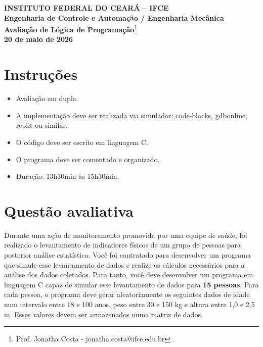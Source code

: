 \documentclass[11pt]{article}
\begin{document}
	
	\begin{center}
		\textbf{\large INSTITUTO FEDERAL DO CEARÁ – IFCE}\\
		\textbf{Engenharia de Controle e Automação / Engenharia Mecânica}\\
		\textbf{Avaliação de Lógica de Programação}\footnote{Prof. Jonatha Costa - jonatha.costa@ifce.edu.br}\\
		\textbf{20 de maio de 2026}
	\end{center}
	
	\section*{Instruções}
	
	\begin{itemize}
		\item Avaliação em dupla.
		\item A implementação deve ser realizada via simulador: code-blocks, gdbonline, replit ou similar.
		\item O código deve ser escrito em linguagem C.
        \item O programa deve ser comentado e organizado.
		\item Duração: 13h30min às 15h30min.
	\end{itemize}
	
	\section*{Questão avaliativa}
Durante uma ação de monitoramento promovida por uma equipe de saúde, foi realizado o levantamento de indicadores físicos de um grupo de pessoas para posterior análise estatística.
Você foi contratado para desenvolver um programa que simule esse levantamento de dados e realize os cálculos necessários para a análise dos dados coletados.
Para tanto, você deve desenvolver um programa em linguagem C capaz de simular esse levantamento de dados para \textbf{15 pessoas}.
Para cada pessoa, o programa deve gerar aleatoriamente os seguintes dados de idade num intervalo entre 18 e 100 anos, peso entre 30 e 150 kg e altura entre 1,0 e 2,5 m. 
Esses valores devem ser armazenados numa matriz de dados.
\end{document}
